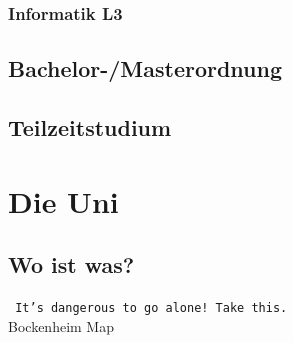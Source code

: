 \documentclass[12pt,a4paper]{scrartcl}
\begin{document}
	\subsubsection{Informatik L3}
	
\newpage

\subsection{Bachelor-/Masterordnung}

\subsection{Teilzeitstudium}
	
\newpage
\section{Die Uni}
	\subsection{Wo ist was?}
			\begin{center}
			\texttt{ It's dangerous to go alone! Take this. }
            \\Bockenheim Map
			\end{center}
		\pagebreak
    
		
\end{document}
